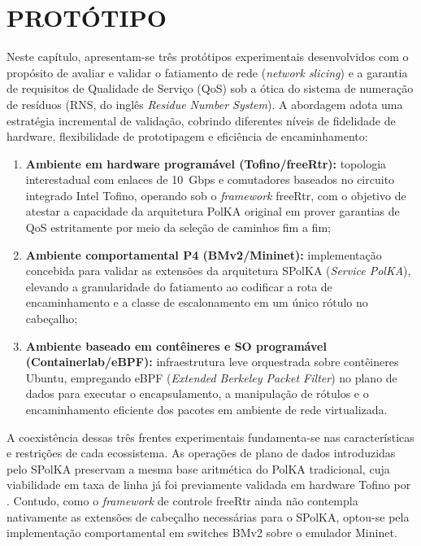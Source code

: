 \chapter{PROTÓTIPO}
\label{chap:prototipos}

Neste capítulo, apresentam-se três protótipos experimentais desenvolvidos com o propósito de avaliar e validar o fatiamento de rede (\textit{network slicing}) e a garantia de requisitos de Qualidade de Serviço (QoS) sob a ótica do sistema de numeração de resíduos (RNS, do inglês \textit{Residue Number System}). A abordagem adota uma estratégia incremental de validação, cobrindo diferentes níveis de fidelidade de hardware, flexibilidade de prototipagem e eficiência de encaminhamento:

\begin{enumerate}
    \item \textbf{Ambiente em hardware programável (Tofino/freeRtr):} topologia interestadual com enlaces de 10~Gbps e comutadores baseados no circuito integrado Intel Tofino\textregistered, operando sob o \textit{framework} freeRtr, com o objetivo de atestar a capacidade da arquitetura PolKA original em prover garantias de QoS estritamente por meio da seleção de caminhos fim a fim;
    \item \textbf{Ambiente comportamental P4 (BMv2/Mininet):} implementação concebida para validar as extensões da arquitetura SPolKA (\textit{Service PolKA}), elevando a granularidade do fatiamento ao codificar a rota de encaminhamento e a classe de escalonamento em um único rótulo no cabeçalho;
    \item \textbf{Ambiente baseado em contêineres e SO programável (Containerlab/eBPF):} infraestrutura leve orquestrada sobre contêineres Ubuntu, empregando eBPF (\textit{Extended Berkeley Packet Filter}) no plano de dados para executar o encapsulamento, a manipulação de rótulos e o encaminhamento eficiente dos pacotes em ambiente de rede virtualizada.
\end{enumerate}

A coexistência dessas três frentes experimentais fundamenta-se nas características e restrições de cada ecossistema. As operações de plano de dados introduzidas pelo SPolKA preservam a mesma base aritmética do PolKA tradicional, cuja viabilidade em taxa de linha já foi previamente validada em hardware Tofino por \cite{dominicini2021}. Contudo, como o \textit{framework} de controle freeRtr ainda não contempla nativamente as extensões de cabeçalho necessárias para o SPolKA, optou-se pela implementação comportamental em switches BMv2 sobre o emulador Mininet.

